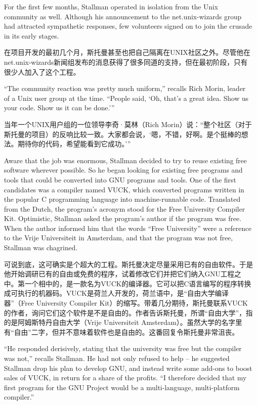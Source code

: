\ifdefined\eng
For the first few months, Stallman operated in isolation from the Unix community as well. Although his announcement to the net.unix-wizards group had attracted sympathetic responses, few volunteers signed on to join the crusade in its early stages.
\fi

\ifdefined\chs
在项目开发的最初几个月，斯托曼甚至也把自己隔离在UNIX社区之外。尽管他在net.unix-wizards新闻组发布的消息获得了很多同道的支持，但在最初阶段，只有很少人加入了这个工程。
\fi

\ifdefined\eng
``The community reaction was pretty much uniform,'' recalls Rich Morin, leader of a Unix user group at the time. ``People said, `Oh, that's a great idea. Show us your code. Show us it can be done.'\hspace{0.01in}''
\fi

\ifdefined\chs
当年一个UNIX用户组的一位领导李奇·莫林（Rich
Morin）说：``整个社区（对于斯托曼的项目）的反响比较一致。大家都会说，`嗯，不错，好啊。是个挺棒的想法。期待你的代码，希望能看到它成功。'\hspace{0.01in}''
\fi

\ifdefined\eng
Aware that the job was enormous, Stallman decided to try to reuse existing free software wherever possible.  So he began looking for existing free programs and tools that could be converted into GNU programs and tools. One of the first candidates was a compiler named VUCK, which converted programs written in the popular C programming language into machine-runnable code. Translated from the Dutch, the program's acronym stood for the Free University Compiler Kit. Optimistic, Stallman asked the program's author if the program was free. When the author informed him that the words ``Free University'' were a reference to the Vrije Universiteit in Amsterdam, and that the program was not free, Stallman was chagrined.
\fi

\ifdefined\chs
可说到底，这可确实是个超大的工程。斯托曼决定尽量采用已有的自由软件。于是他开始调研已有的自由或免费的程序，试着修改它们并把它们纳入GNU工程之中。第一个相中的，是一款名为VUCK的编译器。它可以把C语言编写的程序转换成可执行的机器码。VUCK是荷兰人开发的，荷兰语中，是``自由大学编译器''（Free University Compiler Kit）的缩写。带着几分期待，斯托曼联系VUCK的作者，询问它们这个软件是不是自由的。作者告诉斯托曼，所谓``自由大学''，指的是阿姆斯特丹自由大学（Vrije Universiteit Amsterdam）。虽然大学的名字里有``自由''二字，但并不意味着软件也是自由的。这番回复令斯托曼非常沮丧。
\fi

\ifdefined\eng
``He responded derisively, stating that the university was free but the compiler was not,'' recalls Stallman. He had not only refused to help -- he suggested Stallman drop his plan to develop GNU, and instead write some add-ons to boost sales of VUCK, in return for a share of the profits. ``I therefore decided that my first program for the GNU Project would be a multi-language, multi-platform compiler.''
\fi

